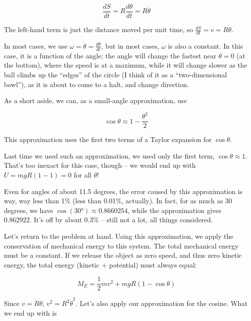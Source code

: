\begin{equation}
\frac{dS}{dt} = R \frac{d\theta}{dt} = R \dot{\theta}
\end{equation}

The left-hand term is just the distance moved per unit time, so $\displaystyle \frac{dS}{dt} = v = R \dot{\theta}$.

In most cases, we use $\displaystyle \omega = \dot{\theta} = \frac{d\theta}{dt}$, but in most cases, $\omega$ is also a constant. In this case, it is a function of the angle; the angle will change the fastest near $\theta = 0$ (at the bottom), where the speed is at a maximum, while it will change slower as the ball climbs up the ``edges'' of the circle (I think of it as a ``two-dimensional bowl''), as it is about to come to a halt, and change direction.

As a short aside, we can, as a small-angle approximation, use

\begin{equation}
\cos \theta \approx 1 - \frac{\theta^2}{2}
\end{equation}

This approximation uses the first two terms of a Taylor expansion for $\cos \theta$. 

Last time we used such an approximation, we used only the first term, $\cos \theta \approx 1$. That's too inexact for this case, though -- we would end up with $U = m g R (1 - 1) = 0$ for all $\theta$!

Even for angles of about 11.5 degrees, the error caused by this approximation is way, way less than 1\% (less than 0.01\%, actually). In fact, for as much as 30 degrees, we have $\cos(\ang{30}) \approx 0.8660254$, while the approximation gives $0.862922$. It's off by about 0.3\% -- still not a lot, all things considered.

Let's return to the problem at hand. Using this approximation, we apply the conservation of mechanical energy to this system. The total mechanical energy must be a constant. If we release the object as zero speed, and thus zero kinetic energy, the total energy (kinetic + potential) must always equal:

\begin{equation}
M_E = \frac{1}{2} m v^2 + m g R(1 - \cos \theta)
\end{equation}

Since $v = R \dot{\theta}$, $v^2 = R^2 \dot{\theta}^2$. Let's also apply our approximation for the cosine. What we end up with is

